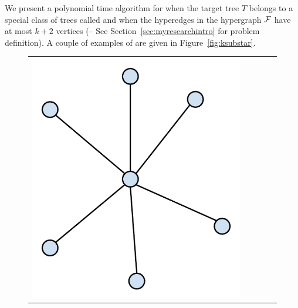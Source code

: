 We present a polynomial time algorithm for {\CFTPL} when the target
tree $T$ belongs to a special class of trees called {\em \kstars} and
when the hyperedges in the hypergraph ${\cal F}$ have at most $k+2$
vertices (\CFTPLKTREE -- See Section~\ref{sec:myresearchintro} for
problem definition). A couple of examples of {\kstars} are given in
Figure~\ref{fig:ksubstar}.


\begin{figure}[t]
  \centering
  \begin{tabular}[h]{ccccc}
    \includegraphics[scale=0.3]{../img/star.pdf} &&&&

\end{tabular}
\end{figure}
